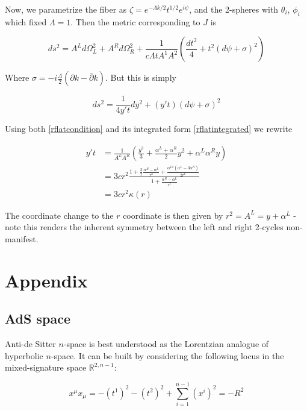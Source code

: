 \documentclass[11pt,a4paper,oneside,openright,titlepage]{book}
\begin{document}
Now, we parametrize the fiber as $\zeta = e^{-\Lambda k/2} t^{1/2} e^{i\psi}$, and the 2-spheres with $\theta_i$, $\phi_i$ which fixed $\Lambda = 1$. Then the metric corresponding to $J$ is

\begin{equation}
	ds^2 = A^L d\Omega^2_L + A^R d\Omega^2_R + \frac{1}{c\Lambda t A^1 A^2} \left( \frac{dt^2}{4} + t^2 (d\psi + \sigma)^2 \right)
\end{equation}

Where $\sigma = -i\frac{\Lambda}{2}(\partial k - \bar \partial k)$. But this is simply

\begin{equation}
	ds^2 = \frac{1}{4y't} dy^2 + (y' t) (d\psi + \sigma)^2
\end{equation}

Using both \ref{rflatcondition} and its integrated form \ref{rflatintegrated} we rewrite

\begin{align}
	y't & = \frac{1}{A^L A^R} \left( \frac{y^3}{3} + \frac{\alpha^L + \alpha^R}{2} y^2 + \alpha^L \alpha^R y \right)\\
	& = 3cr^2 \frac{1+ \frac{3}{2} \frac{\alpha^R - \alpha^L}{r^2} + \frac{\alpha^{L2}(\alpha^L - 3 \alpha^R)}{2r^6} }{1+ \frac{\alpha^R -\alpha^L}{r^2} }\\
	& = 3cr^2 \kappa(r)
\end{align}



The coordinate change to the $r$ coordinate is then given by $r^2 = A^L = y + \alpha^L$ - note this renders the inherent symmetry between the left and right 2-cycles non-manifest.\\




\appendix

\chapter{Appendix}

\section{AdS space}

Anti-de Sitter $n$-space is best understood as the Lorentzian analogue of hyperbolic $n$-space. It can be built by considering the following locus in the mixed-signature space $\mathbb{R}^{2,n-1}$:

\begin{equation} \label{ads locus}
x^\mu x_\mu = -(t^1)^2 - (t^2)^2 + \sum_{i=1}^{n-1} (x^i)^2  =  - R^2
\end{equation}
\end{document}

